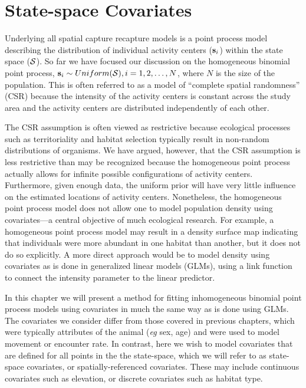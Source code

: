 \documentclass{book}
\begin{document}
\chapter{State-space Covariates}

Underlying all spatial capture recapture models is a point process
model describing the distribution of individual activity
centers (${\bf s}_i$) within the state space ($\cal{S}$). So far we have focused our
discussion on the homogeneous binomial point process,
${\bf s}_i \sim Uniform({\cal S}), i=1,2,\dots,N$, where $N$ is the
size of the population. This is often referred to as a model of
``complete spatial randomness'' (CSR) because the intensity of the
activity centers is constant across the study area and the activity
centers are distributed independently of each other.

The CSR assumption is often viewed as restrictive
because ecological processes such as
territoriality and habitat selection typically result in non-random
distributions of organisms. We have argued, however, that the CSR
assumption is less restrictive than may be recognized because the
homogeneous point process actually allows for infinite
possible configurations of activity centers. Furthermore, given enough data,
the uniform prior will have very little influence on the estimated
locations of activity centers. Nonetheless, the homogeneous point
process model does not allow one to model population density using
covariates---a central objective of much ecological research.
For example, a homogeneous point process model
may result in a density surface map indicating that individuals were
more abundant in one habitat than another, but it does not do so
explicitly. A more direct approach would be to model density using
covariates as is done in generalized linear models (GLMs), using a
link function to connect the intensity parameter to the linear predictor.

In this chapter we will present a method
for fitting inhomogeneous binomial point process models using
covariates in much the same way as is done using GLMs. The
covariates we consider differ
from those covered in previous chapters, which were typically
attributes of the animal ({\it eg} sex, age) and were used to model movement or encounter
rate. In contrast, here we wish to
model covariates that are defined for all points in the
the state-space, which we will refer to as
state-space covariates, or spatially-referenced covariates. These may
include continuous covariates such as elevation, or discrete
covariates such as habitat type.
\end{document}

